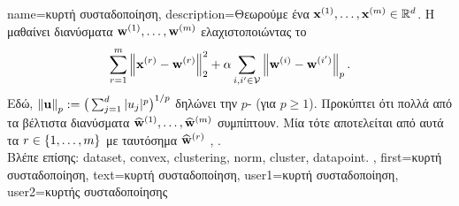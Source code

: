  {name={\foreignlanguage{greek}{κυρτή συσταδοποίηση}}, 
 	description={\foreignlanguage{greek}{Θεωρούμε ένα} 
		 ${\bf x}^{(1)}, \ldots, {\bf x}^{(m)} \in \mathbb{R}^{d}$. 
 		\foreignlanguage{greek}{Η}   \foreignlanguage{greek}{μαθαίνει διανύσματα 
		${\bf w}^{(1)}, \ldots, {\bf w}^{(m)}$ ελαχιστοποιώντας το} 
 		$$\sum_{r=1}^{m} \left\Vert {{\bf x}^{(r)} - {\bf w}^{(r)}} \right\Vert_{2}^2 + 
 		\alpha \sum_{i,i' \in \mathcal{V}} \left\Vert {{\bf w}^{(i)} - {\bf w}^{(i')}} \right\Vert_{p}.$$ 
		\foreignlanguage{greek}{Εδώ,} $\left\Vert {{\bf u}} \right\Vert_{p} := \big( \sum_{j=1}^{d} |u_{j}|^{p} \big)^{1/p}$ 
		\foreignlanguage{greek}{δηλώνει την} $p$- (\foreignlanguage{greek}{για} $p\geq1$).  
		\foreignlanguage{greek}{Προκύπτει ότι πολλά από τα βέλτιστα διανύσματα} $\widehat{{\bf w}}^{(1)}, \ldots, \widehat{{\bf w}}^{(m)}$ 
		\foreignlanguage{greek}{συμπίπτουν. Μία}  \foreignlanguage{greek}{τότε αποτελείται από αυτά τα} 
		\linebreak $r \in \{1, \ldots, m\}$ 
		\foreignlanguage{greek}{με ταυτόσημα} $\widehat{{\bf w}}^{(r)}$ \cite{JMLR:v22:18-694}, \cite{Pelckmans2005}.\\
		\foreignlanguage{greek}{Βλέπε επίσης:} \gls{dataset}, \gls{convex}, \gls{clustering}, \gls{norm}, \gls{cluster}, \gls{datapoint}. },
 	first={\foreignlanguage{greek}{κυρτή συσταδοποίηση}},
	text={\foreignlanguage{greek}{κυρτή συσταδοποίηση}},
	user1={\foreignlanguage{greek}{κυρτή συσταδοποίηση}}, %
	user2={\foreignlanguage{greek}{κυρτής συσταδοποίησης}} %
}

